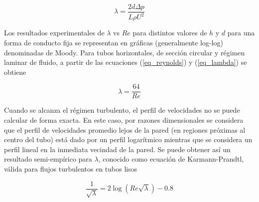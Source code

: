 \begin{equation}
	\lambda = \frac{2d \Delta p}{L\rho U^2} \label{eq_lambda}
\end{equation}

Los resultados experimentales de $\lambda$ vs $Re$ para distintos valores de $h$ y $d$ para una forma de conducto fija se representan en gráficas (generalmente log-log) denominadas de Moody. Para tubos horizontales, de sección circular y régimen laminar de fluido, a partir de las ecuaciones (\ref{eq_reynolds}) y (\ref{eq_lambda}) se obtiene

\begin{equation}
	\lambda = \frac{64}{Re} \label{eq_lambda_reynolds}
\end{equation}

Cuando se alcanza el régimen turbulento, el perfil de velocidades no se puede calcular de forma exacta. En este caso, por razones dimensionales se considera que el perfil de velocidades promedio lejos de la pared (en regiones próximas al centro del tubo) está dado por un perfil logarítmico mientras que se considera un perfil lineal en la inmediata vecindad de la pared. Se puede obtener así un resultado semi-empírico para $\lambda$, conocido como ecuación de Karmann-Prandtl, válida para flujos turbulentos en tubos lisos

\begin{equation}
	\frac{1}{\sqrt{\lambda}} = 2\log \left( Re \sqrt{\lambda} \right) - 0.8 \label{eq_karmann_prandtl}
\end{equation}